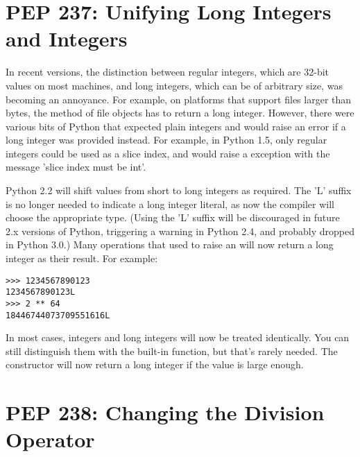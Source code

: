 \documentclass{howto}
\begin{document}
\section{PEP 237: Unifying Long Integers and Integers}

In recent versions, the distinction between regular integers, which
are 32-bit values on most machines, and long integers, which can be of
arbitrary size, was becoming an annoyance.  For example, on platforms
that support files larger than  bytes, the
 method of file objects has to return a long integer.
However, there were various bits of Python that expected plain
integers and would raise an error if a long integer was provided
instead.  For example, in Python 1.5, only regular integers
could be used as a slice index, and  would raise a
 exception with the message 'slice index must be
int'.

Python 2.2 will shift values from short to long integers as required.
The 'L' suffix is no longer needed to indicate a long integer literal,
as now the compiler will choose the appropriate type.  (Using the 'L'
suffix will be discouraged in future 2.x versions of Python,
triggering a warning in Python 2.4, and probably dropped in Python
3.0.)  Many operations that used to raise an 
will now return a long integer as their result.  For example:

\begin{verbatim}
>>> 1234567890123
1234567890123L
>>> 2 ** 64
18446744073709551616L
\end{verbatim}

In most cases, integers and long integers will now be treated
identically.  You can still distinguish them with the
 built-in function, but that's rarely needed.  The
 constructor will now return a long integer if the value
is large enough.  

\begin{seealso}


\end{seealso}


\section{PEP 238: Changing the Division Operator}
\end{document}

